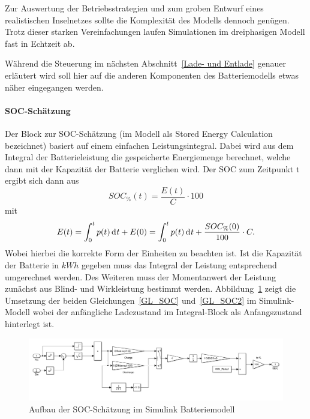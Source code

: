 Zur Auswertung der Betriebsstrategien und zum groben Entwurf eines realistischen Inselnetzes sollte die Komplexität
des Modells dennoch genügen.
Trotz dieser starken Vereinfachungen laufen Simulationen im dreiphasigen Modell fast in Echtzeit ab.

Während die Steuerung im nächsten Abschnitt~\ref{Lade- und Entlade} genauer erläutert wird soll hier auf die anderen
Komponenten des Batteriemodells etwas näher eingegangen werden.

\paragraph{SOC-Schätzung}
Der Block zur SOC-Schätzung (im Modell als Stored Energy Calculation bezeichnet) basiert auf einem einfachen Leistungsintegral.
Dabei wird aus dem Integral der Batterieleistung die gespeicherte Energiemenge berechnet, welche dann mit der Kapazität der Batterie verglichen wird.
Der SOC zum Zeitpunkt t ergibt sich dann aus
\begin{equation}\label{GL_SOC}
	SOC_{\%}(t) = \frac{E(t)}{C} \cdot 100
\end{equation}
mit
\begin{equation}\label{GL_SOC2}
	E(t) = \int_{0}^{t}p(t) \diff t + E(0) = \int_{0}^{t}p(t) \diff t + \frac{SOC_{\%}(0)}{100}\cdot C.
\end{equation}
Wobei hierbei die korrekte Form der Einheiten zu beachten ist.
Ist die Kapazität der Batterie in $kWh$ gegeben muss das Integral der Leistung entsprechend umgerechnet werden.
Des Weiteren muss der Momentanwert der Leistung zunächst aus Blind- und Wirkleistung bestimmt werden.
Abbildung~\ref{SOC} zeigt die Umsetzung der beiden Gleichungen~\ref{GL_SOC} und~\ref{GL_SOC2} im Simulink-Modell 
wobei der anfängliche Ladezustand im Integral-Block als Anfangszustand hinterlegt ist.
\begin{figure}[h!]
	\centering
	\includegraphics[width=12cm]{Abbildungen/SOC.png}
	\caption{Aufbau der SOC-Schätzung im Simulink Batteriemodell}\label{SOC}
\end{figure}

